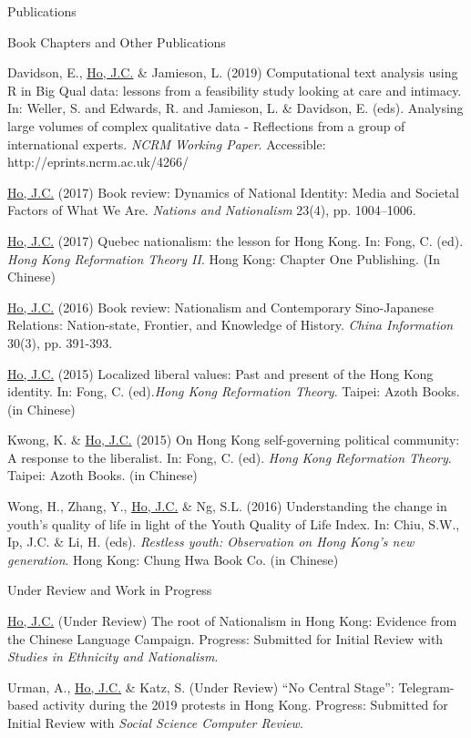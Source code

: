 \documentclass{resume} %
\begin{document}
\begin{rSection}{Publications}
\begin{rSubsectionPublication}{Book Chapters and Other Publications}
\item Davidson, E., \underline{Ho, J.C.} \& Jamieson, L. (2019) Computational text analysis using R in Big Qual data: lessons from a feasibility study looking at care and intimacy. In: Weller, S. and Edwards, R. and Jamieson, L. \& Davidson, E. (eds). Analysing large volumes of complex qualitative data - Reflections from a group of international experts. \textit{NCRM Working Paper}. Accessible: http://eprints.ncrm.ac.uk/4266/
\item \underline{Ho, J.C.} (2017) Book review: Dynamics of National Identity: Media and Societal Factors of What We Are. \textit{Nations and Nationalism} 23(4), pp. 1004–1006.
\item \underline{Ho, J.C.} (2017) Quebec nationalism: the lesson for Hong Kong. In: Fong, C. (ed). \textit{Hong Kong Reformation Theory II}. Hong Kong: Chapter One Publishing. (In Chinese)
\item \underline{Ho, J.C.} (2016) Book review: Nationalism and Contemporary Sino-Japanese Relations: Nation-state, Frontier, and Knowledge of History. \textit{China Information} 30(3), pp. 391-393.
\item \underline{Ho, J.C.} (2015) Localized liberal values: Past and present of the Hong Kong identity. In: Fong, C. (ed).\textit{Hong Kong Reformation Theory}. Taipei: Azoth Books. (in Chinese)
\item Kwong, K. \& \underline{Ho, J.C.} (2015) On Hong Kong self-governing political community: A response to the liberalist. In: Fong, C. (ed). \textit{Hong Kong Reformation Theory}. Taipei: Azoth Books. (in Chinese)
\item Wong, H., Zhang, Y., \underline{Ho, J.C.} \& Ng, S.L. (2016) Understanding the change in youth’s quality of life in light of the Youth Quality of Life Index. In: Chiu, S.W., Ip, J.C. \& Li, H. (eds). \textit{Restless youth: Observation on Hong Kong’s new generation}. Hong Kong: Chung Hwa Book Co. (in Chinese)
\end{rSubsectionPublication}

\newpage
\begin{rSubsectionPublication}{Under Review and Work in Progress}
\item \underline{Ho, J.C.} (Under Review) The root of Nationalism in Hong Kong: Evidence from the Chinese Language Campaign. Progress: Submitted for Initial Review with \textit{Studies in Ethnicity and Nationalism}.
\item Urman, A., \underline{Ho, J.C.} \& Katz, S. (Under Review) “No Central Stage”: Telegram-based activity during the 2019 protests in Hong Kong. Progress: Submitted for Initial Review with \textit{Social Science Computer Review}.
\end{rSubsectionPublication}
\end{rSection}
\end{document}
